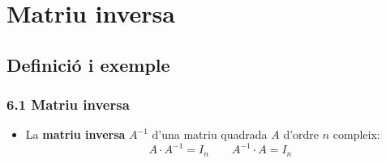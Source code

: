 \documentclass[aspectratio=169]{beamer}
\begin{document}
\section{Matriu inversa}
\subsection{Definició i exemple}

\begin{frame}[t]
  \frametitle{6.1 Matriu inversa}

  \vspace{-0.28cm}
  \begin{itemize}
    \item<1-> La \textbf{matriu inversa} $A^{-1}$ d'una matriu quadrada $A$ d'ordre $n$ compleix:
      \[
        A \cdot A^{-1} = I_n \qquad A^{-1} \cdot A = I_n
      \]
  \end{itemize}



\end{frame}
\end{document}
